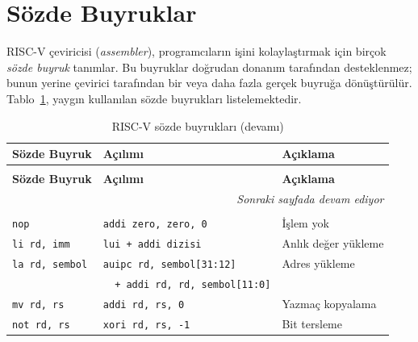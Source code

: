 \section{Sözde Buyruklar}
\label{sec:ekc-sozde-buyruklar}

RISC-V çeviricisi (\emph{assembler}), programcıların işini kolaylaştırmak için birçok \emph{sözde buyruk} tanımlar. Bu buyruklar doğrudan donanım tarafından desteklenmez; bunun yerine çevirici tarafından bir veya daha fazla gerçek buyruğa dönüştürülür. Tablo~\ref{tab:ekc-sozde-buyruklar}, yaygın kullanılan sözde buyrukları listelemektedir.

{\small
\begin{longtable}{@{}l@{\quad}l@{\quad}l@{}}
\caption{RISC-V sözde buyrukları}\label{tab:ekc-sozde-buyruklar}\\
\toprule
\textbf{Sözde Buyruk} & \textbf{Açılımı} & \textbf{Açıklama} \\
\midrule
\endfirsthead

\caption[]{RISC-V sözde buyrukları (devamı)}\\
\toprule
\textbf{Sözde Buyruk} & \textbf{Açılımı} & \textbf{Açıklama} \\
\midrule
\endhead

\midrule
\multicolumn{3}{r}{\footnotesize\textit{Sonraki sayfada devam ediyor}} \\
\endfoot

\bottomrule
\endlastfoot

\multicolumn{3}{l}{\textbf{Temel Sözde Buyruklar}} \\
\midrule
\texttt{nop} &
\texttt{addi zero, zero, 0} &
İşlem yok\index{nop} \\[3pt]

\texttt{li rd, imm} &
\texttt{lui + addi dizisi} &
Anlık değer yükleme\index{li} \\[3pt]

\texttt{la rd, sembol} &
\texttt{auipc rd, sembol[31:12]} &
Adres yükleme\index{la} \\
 &
\texttt{~~+ addi rd, rd, sembol[11:0]} &
 \\[3pt]

\texttt{mv rd, rs} &
\texttt{addi rd, rs, 0} &
Yazmaç kopyalama\index{mv} \\[3pt]

\texttt{not rd, rs} &
\texttt{xori rd, rs, -1} &
Bit tersleme\index{not} \\[3pt]


\end{longtable}}
